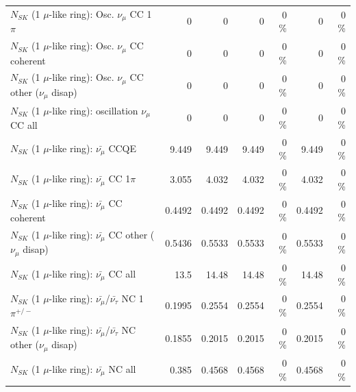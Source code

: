 \begin{table}
\begin{tabular}{| l | r | r | r  r | r  r |}
                          $N_{SK}$ (1 $\mu$-like ring): Osc. $\nu_\mu$ CC 1$\pi$ &               0 &               0 &               0 &        0 \%  &               0 &        0 \%  \\ 
                        $N_{SK}$ (1 $\mu$-like ring): Osc. $\nu_\mu$ CC coherent &               0 &               0 &               0 &        0 \%  &               0 &        0 \%  \\ 
         $N_{SK}$ (1 $\mu$-like ring): Osc. $\nu_\mu$ CC other ($\nu_\mu$ disap) &               0 &               0 &               0 &        0 \%  &               0 &        0 \%  \\ 
                      $N_{SK}$ (1 $\mu$-like ring): oscillation $\nu_\mu$ CC all &               0 &               0 &               0 &        0 \%  &               0 &        0 \%  \\ 
\hline
\hline
                              $N_{SK}$ (1 $\mu$-like ring): $\bar{\nu_\mu}$ CCQE &           9.449 &           9.449 &           9.449 &        0 \%  &           9.449 &        0 \%  \\ 
                         $N_{SK}$ (1 $\mu$-like ring): $\bar{\nu_\mu}$ CC 1$\pi$ &           3.055 &           4.032 &           4.032 &        0 \%  &           4.032 &        0 \%  \\ 
                       $N_{SK}$ (1 $\mu$-like ring): $\bar{\nu_\mu}$ CC coherent &          0.4492 &          0.4492 &          0.4492 &        0 \%  &          0.4492 &        0 \%  \\ 
        $N_{SK}$ (1 $\mu$-like ring): $\bar{\nu_\mu}$ CC other ($\nu_\mu$ disap) &          0.5436 &          0.5533 &          0.5533 &        0 \%  &          0.5533 &        0 \%  \\ 
                          $N_{SK}$ (1 $\mu$-like ring): $\bar{\nu_{\mu}}$ CC all &            13.5 &           14.48 &           14.48 &        0 \%  &           14.48 &        0 \%  \\ 
\hline
  $N_{SK}$ (1 $\mu$-like ring): $\bar{\nu_\mu}$/$\bar{\nu_\tau}$ NC 1$\pi^{+/-}$ &          0.1995 &          0.2554 &          0.2554 &        0 \%  &          0.2554 &        0 \%  \\ 
$N_{SK}$ (1 $\mu$-like ring): $\bar{\nu_\mu}$/$\bar{\nu_\tau}$ NC other ($\nu_\mu$ disap) &          0.1855 &          0.2015 &          0.2015 &        0 \%  &          0.2015 &        0 \%  \\ 
                          $N_{SK}$ (1 $\mu$-like ring): $\bar{\nu_{\mu}}$ NC all &           0.385 &          0.4568 &          0.4568 &        0 \%  &          0.4568 &        0 \%  \\ 

\end{tabular}
\end{table}
